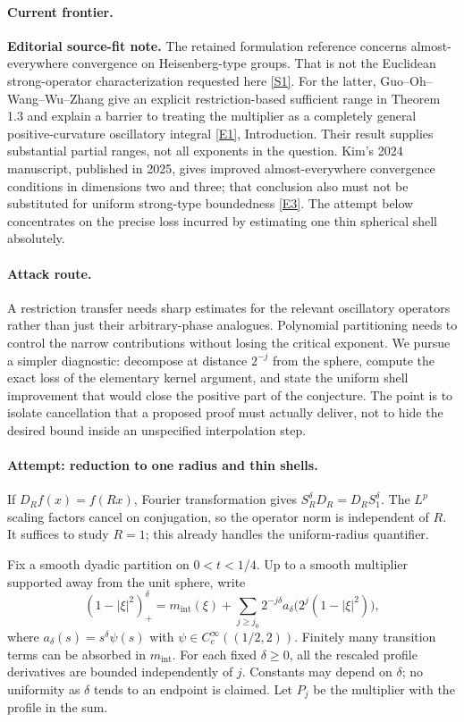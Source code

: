 \documentclass[11pt,a4paper]{article}
\newcommand{\sref}[2]{\hyperlink{source:#1:#2}{[S#2]}}
\newcommand{\eref}[2]{\hyperlink{extra:#1:#2}{[E#2]}}
\numberwithin{equation}{section}
\begin{document}
\paragraph{Current frontier.}
\textbf{Editorial source-fit note.} The retained formulation reference
concerns almost-everywhere convergence on Heisenberg-type groups. That is
not the Euclidean strong-operator characterization requested here
\sref{180}{1}. For the latter, Guo--Oh--Wang--Wu--Zhang give an explicit
restriction-based sufficient range in Theorem 1.3 and explain a barrier to
treating the multiplier as a completely general positive-curvature
oscillatory integral \eref{180}{1}, Introduction. Their result supplies
substantial partial ranges, not all exponents in the question. Kim's
2024 manuscript, published in 2025, gives improved almost-everywhere
convergence conditions in dimensions two and three; that conclusion also
must not be substituted for uniform strong-type boundedness
\eref{180}{3}. The attempt below concentrates on the precise loss incurred
by estimating one thin spherical shell absolutely.

\paragraph{Attack route.}
A restriction transfer needs sharp estimates for the relevant oscillatory
operators rather than just their arbitrary-phase analogues. Polynomial
partitioning needs to control the narrow contributions without losing the
critical exponent. We pursue a simpler diagnostic: decompose at distance
$2^{-j}$ from the sphere, compute the exact loss of the elementary
kernel argument, and state the uniform shell improvement that would close
the positive part of the conjecture. The point is to isolate cancellation
that a proposed proof must actually deliver, not to hide the desired bound
inside an unspecified interpolation step.

\paragraph{Attempt: reduction to one radius and thin shells.}
If $D_Rf(x)=f(Rx)$, Fourier transformation gives
$S_R^\delta D_R=D_RS_1^\delta$. The $L^p$ scaling factors cancel on
conjugation, so the operator norm is independent of $R$. It suffices to
study $R=1$; this already handles the uniform-radius quantifier.

Fix a smooth dyadic partition on $0<t<1/4$. Up to a smooth multiplier
supported away from the unit sphere, write
\begin{equation}\label{eq180-shells}
 (1-|\xi|^2)_+^\delta
 =m_{\mathrm{int}}(\xi)+\sum_{j\ge j_0}2^{-j\delta}
          a_\delta\bigl(2^j(1-|\xi|^2)\bigr),
\end{equation}
where $a_\delta(s)=s^\delta\psi(s)$ with
$\psi\in C_c^\infty((1/2,2))$. Finitely many transition terms can be
absorbed in $m_{\mathrm{int}}$. For each fixed $\delta\ge0$, all the
rescaled profile derivatives are bounded independently of $j$. Constants
may depend on $\delta$; no uniformity as $\delta$ tends to an endpoint is
claimed. Let $P_j$ be the multiplier with the profile in the sum.
\end{document}
